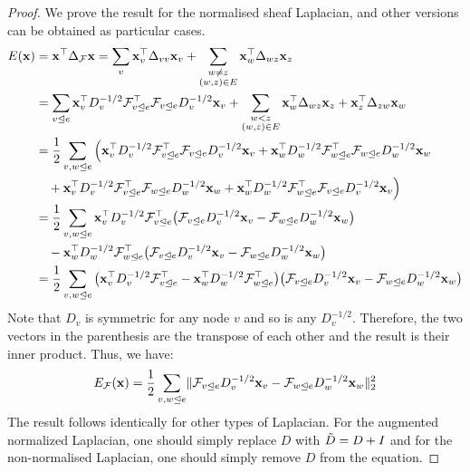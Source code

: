 \documentclass{article}
\def\vx{{\bf{x}}}
\def\gF{{\mathcal{F}}}
\newcommand{\tleq}{\trianglelefteq}
\DeclarePairedDelimiter{\norm}{\lVert}{\rVert}
\begin{document}
\begin{proof}We prove the result for the normalised sheaf Laplacian, and other versions can be obtained as particular cases. 
\begin{align}
    E(\vx) &= \vx^\top \Delta_\gF \vx = \sum_{v} \vx^\top_v \Delta_{vv} \vx_v + \sum_{\substack{w 
         \neq z \\ (w, z) \in E}} \vx^\top_w \Delta_{wz} \vx_z \\
         &= \sum_{v \tleq e} \vx^\top_v D_v^{-1/2} \gF^\top_{v \tleq e} \gF_{v \tleq e} D_v^{-1/2}\vx_v + \sum_{\substack{w < z \\ (w, z) \in E}} \vx^\top_w \Delta_{wz} \vx_z + \vx^\top_z \Delta_{zw} \vx_w  \\
         &= \frac{1}{2} \sum_{v,w \tleq e} \Big(\vx^\top_v D_v^{-1/2} \gF^\top_{v \tleq e} \gF_{v \tleq e} D_v^{-1/2}\vx_v + \vx^\top_w D_w^{-1/2} \gF^\top_{w \tleq e} \gF_{w \tleq e} D_w^{-1/2}\vx_w \\
         &\quad + \vx^\top_v D_v^{-1/2} \gF^\top_{v \tleq e} \gF_{w \tleq e} D_w^{-1/2}\vx_w + \vx^\top_w D_w^{-1/2} \gF^\top_{w \tleq e} \gF_{v \tleq e} D_v^{-1/2}\vx_v \Big) \\
         &= \frac{1}{2} \sum_{v,w \tleq e} \vx^\top_v D_v^{-1/2} \gF^\top_{v \tleq e}
         \big(\gF_{v \tleq e} D_v^{-1/2}\vx_v - \gF_{w \tleq e} D_w^{-1/2}\vx_w \big) \\
         &\quad - \vx^\top_w D_w^{-1/2} \gF^\top_{w \tleq e} \big(\gF_{v \tleq e} D_v^{-1/2}\vx_v - \gF_{w \tleq e} D_w^{-1/2}\vx_w \big) \\
         &= \frac{1}{2} \sum_{v,w \tleq e} \big(\vx^\top_v D_v^{-1/2} \gF^\top_{v \tleq e} - \vx^\top_w D_w^{-1/2} \gF^\top_{w \tleq e}\big) \big(\gF_{v \tleq e} D_v^{-1/2}\vx_v - \gF_{w \tleq e} D_w^{-1/2}\vx_w \big)
\end{align}
Note that $D_v$ is symmetric for any node $v$ and so is any $D_v^{-1/2}$. Therefore, the two vectors in the parenthesis are the transpose of each other and the result is their inner product. Thus, we have:
\begin{align}
    E_\gF(\vx) = \frac{1}{2} \sum_{v,w \tleq e} \norm{\gF_{v \tleq e} D_v^{-1/2}\vx_v - \gF_{w \tleq e} D_w^{-1/2}\vx_w}_2^2
\end{align}
The result follows identically for other types of Laplacian. For the augmented normalized Laplacian, one should simply replace $D$ with $\Tilde{D} = D + I$ and for the non-normalised Laplacian, one should simply remove $D$ from the equation. \end{proof}
\end{document}
